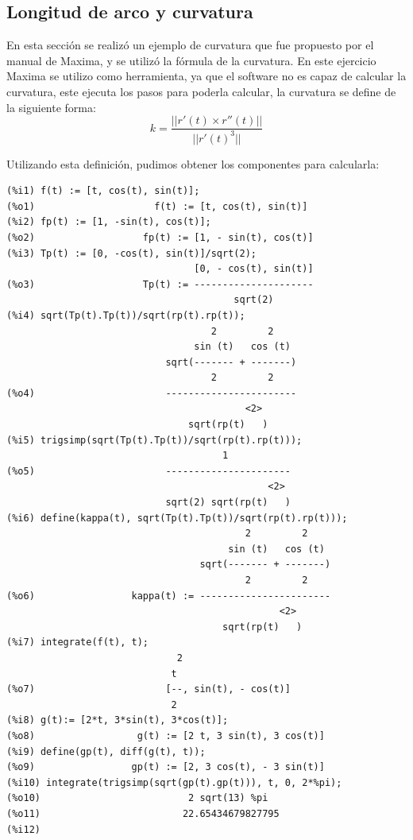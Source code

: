 \documentclass[12pt,letterpaper]{article}
\begin{document}
\subsection{Longitud de arco y curvatura}
En esta sección se realizó un ejemplo de curvatura que fue propuesto por el manual de Maxima, y se utilizó la fórmula de la curvatura. En este ejercicio Maxima se utilizo como herramienta, ya que el software no es capaz de calcular la curvatura, este ejecuta los pasos para poderla calcular, la curvatura se define de la siguiente forma: 
$$ k = \frac{||r'(t)\times r''(t)||}{||r'(t)^3||} $$

Utilizando esta definición, pudimos obtener los componentes para calcularla:

\begin{verbatim}
(%i1) f(t) := [t, cos(t), sin(t)];
(%o1)                     f(t) := [t, cos(t), sin(t)]
(%i2) fp(t) := [1, -sin(t), cos(t)];
(%o2)                   fp(t) := [1, - sin(t), cos(t)]
(%i3) Tp(t) := [0, -cos(t), sin(t)]/sqrt(2);
                                 [0, - cos(t), sin(t)]
(%o3)                   Tp(t) := ---------------------
                                        sqrt(2)
(%i4) sqrt(Tp(t).Tp(t))/sqrt(rp(t).rp(t));
                                    2         2
                                 sin (t)   cos (t)
                            sqrt(------- + -------)
                                    2         2
(%o4)                       -----------------------
                                          <2>
                                sqrt(rp(t)   )
(%i5) trigsimp(sqrt(Tp(t).Tp(t))/sqrt(rp(t).rp(t)));
                                      1
(%o5)                       ----------------------
                                              <2>
                            sqrt(2) sqrt(rp(t)   )
(%i6) define(kappa(t), sqrt(Tp(t).Tp(t))/sqrt(rp(t).rp(t)));
                                          2         2
                                       sin (t)   cos (t)
                                  sqrt(------- + -------)
                                          2         2
(%o6)                 kappa(t) := -----------------------
                                                <2>
                                      sqrt(rp(t)   )
(%i7) integrate(f(t), t);
                              2
                             t
(%o7)                       [--, sin(t), - cos(t)]
                             2
(%i8) g(t):= [2*t, 3*sin(t), 3*cos(t)];
(%o8)                  g(t) := [2 t, 3 sin(t), 3 cos(t)]
(%i9) define(gp(t), diff(g(t), t));
(%o9)                 gp(t) := [2, 3 cos(t), - 3 sin(t)]
(%i10) integrate(trigsimp(sqrt(gp(t).gp(t))), t, 0, 2*%pi);
(%o10)                          2 sqrt(13) %pi
(%o11)                         22.65434679827795
(%i12) 
\end{verbatim}
\end{document}
